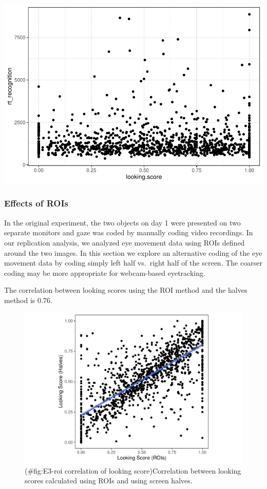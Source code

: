 \documentclass[
  man,floatsintext]{apa6}
\begin{document}
\includegraphics{manuscript_files/figure-latex/Plot Looking Score Correlations-1.pdf}

\subsubsection{Effects of ROIs}\label{effects-of-rois}

In the original experiment, the two objects on day 1 were presented on two separate monitors and gaze was coded by manually coding video recordings. In our replication analysis, we analyzed eye movement data using ROIs defined around the two images. In this section we explore an alternative coding of the eye movement data by coding simply left half vs.~right half of the screen. The coarser coding may be more appropriate for webcam-based eyetracking.

The correlation between looking scores using the ROI method and the halves method is 0.76.

\begin{figure}
\centering
\includegraphics{manuscript_files/figure-latex/E3-roi correlation of looking score-1.pdf}
\caption{(\#fig:E3-roi correlation of looking score)Correlation between looking scores calculated using ROIs and using screen halves.}
\end{figure}
\end{document}
